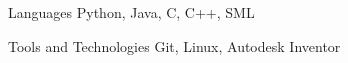 
\begin{cvskills}
    \cvskill
        {Languages} %
        {Python, Java, C, C++, SML} %

    \cvskill
        {Tools and Technologies}
        {Git, Linux, Autodesk Inventor}
\end{cvskills}
